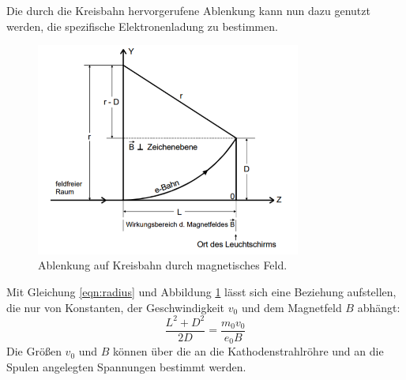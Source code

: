 Die durch die Kreisbahn hervorgerufene Ablenkung kann nun dazu genutzt werden, die spezifische Elektronenladung zu bestimmen.
\begin{figure}
  \centering
  \includegraphics[height=7cm]{data/Kreisablenkung.png}
  \caption{Ablenkung auf Kreisbahn durch magnetisches Feld.}
  \label{fig:Kreis}
\end{figure}
Mit Gleichung \eqref{eqn:radius} und Abbildung \ref{fig:Kreis} lässt sich eine Beziehung aufstellen, die nur von Konstanten, der Geschwindigkeit $v_0$ und dem Magnetfeld $B$ abhängt:
\begin{equation}
  \frac{L^2 + D^2}{2D} = \frac{m_0 v_0}{e_0 B}
\end{equation}
Die Größen $v_0$ und $B$ können über die an die Kathodenstrahlröhre und an die Spulen angelegten Spannungen bestimmt werden.

